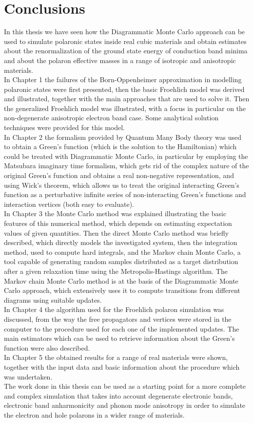 \section*{Conclusions}
In this thesis we have seen how the Diagrammatic Monte Carlo approach can be used to simulate polaronic states inside real cubic 
materials and obtain estimates about the renormalization of the ground state energy of conduction band minima and about the polaron 
effective masses in a range of isotropic and anisotropic materials.\\ 
In Chapter 1 the failures of the Born-Oppenheimer approximation in modelling polaronic states were first presented, then the basic Froehlich model 
was derived and illustrated, together with the main approaches that are used to solve it. Then the generalized Froehlich model was illustrated, with a focus 
in particular on the non-degenerate anisotropic electron band case. Some analytical solution techniques were provided for this model.\\
In Chapter 2 the formalism provided by Quantum Many Body theory was used to obtain a Green's function (which is the solution to the Hamiltonian) which 
could be treated with Diagrammatic Monte Carlo, in particular by employing the Matsubara imaginary time formalism, which gets rid of the complex nature of the original 
Green's function and obtains a real non-negative representation, and using Wick's theorem, which allows us to treat the original interacting 
Green's function as a perturbative infinite series of non-interacting Green's functions and interaction vertices (both easy to evaluate).\\
In Chapter 3 the Monte Carlo method was explained illustrating the basic features of this numerical method, which depends on estimating 
expectation values of given quantities. Then the direct Monte Carlo method was briefly described, which directly models the investigated system, then the integration method, 
used to compute hard integrals, and the Markov chain Monte Carlo, a tool capable of generating random samples distributed as a target distribution after 
a given relaxation time using the Metropolis-Hastings algorithm. The Markov chain Monte Carlo method is at the basis of the Diagrammatic Monte Carlo approach, which 
extensively uses it to compute transitions from different diagrams using suitable updates.\\
In Chapter 4 the algorithm used for the Froehlich polaron simulation was discussed, from the way the free propagators and vertices were stored in the computer to the procedure used for 
each one of the implemented updates. The main estimators which can be used to retrieve information about the Green's function were also described.\\
In Chapter 5 the obtained results for a range of real materials were shown, together with the input data and basic information about the procedure which was undertaken.\\
The work done in this thesis can be used as a starting point for a more complete and complex simulation that takes into account degenerate electronic bands, electronic band anharmonicity and phonon mode 
anisotropy in order to simulate the electron and hole polarons in a wider range of materials.
